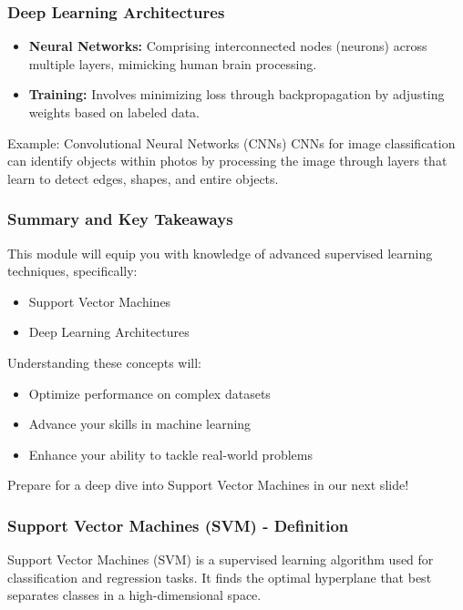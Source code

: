 \documentclass[aspectratio=169]{beamer}
\begin{document}
\begin{frame}[fragile]
    \frametitle{Deep Learning Architectures}
    \begin{itemize}
        \item \textbf{Neural Networks:} Comprising interconnected nodes (neurons) across multiple layers, mimicking human brain processing.
        \item \textbf{Training:} Involves minimizing loss through backpropagation by adjusting weights based on labeled data.
    \end{itemize}
    \begin{block}{Example: Convolutional Neural Networks (CNNs)}
        CNNs for image classification can identify objects within photos by processing the image through layers that learn to detect edges, shapes, and entire objects.
    \end{block}
\end{frame}

\begin{frame}[fragile]
    \frametitle{Summary and Key Takeaways}
    This module will equip you with knowledge of advanced supervised learning techniques, specifically:
    \begin{itemize}
        \item Support Vector Machines
        \item Deep Learning Architectures
    \end{itemize}
    Understanding these concepts will:
    \begin{itemize}
        \item Optimize performance on complex datasets
        \item Advance your skills in machine learning
        \item Enhance your ability to tackle real-world problems
    \end{itemize}
    Prepare for a deep dive into Support Vector Machines in our next slide!
\end{frame}

\begin{frame}[fragile]
    \frametitle{Support Vector Machines (SVM) - Definition}
    Support Vector Machines (SVM) is a supervised learning algorithm used for classification and regression tasks. It finds the optimal hyperplane that best separates classes in a high-dimensional space.
\end{frame}
\end{document}
